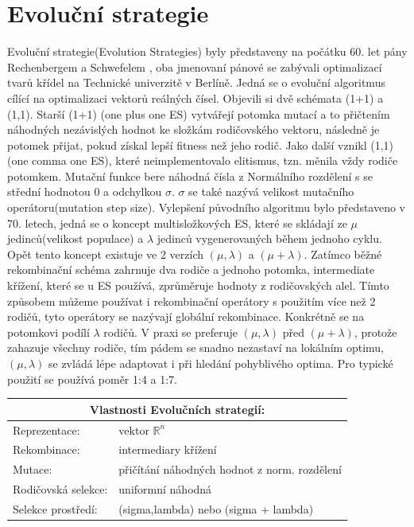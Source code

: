 \section{Evoluční strategie}
\label{sec:ES}
Evoluční strategie(Evolution Strategies) byly představeny na počátku 60. let pány Rechenbergem a Schwefelem \cite{Beyer2002}, oba jmenovaní pánové se zabývali optimalizací tvarů křídel na Technické univerzitě v Berlíně. Jedná se o evoluční algoritmus cílící na optimalizaci vektorů reálných čísel. Objevili si dvě schémata (1+1) a (1,1). Starší (1+1) (one plus one ES) vytvářejí potomka mutací a to přičtením náhodných nezávislých hodnot ke složkám rodičovského vektoru, následně je potomek přijat, pokud získal lepší fitness než jeho rodič. Jako další vznikl (1,1) (one comma one ES), které neimplementovalo elitismus, tzn. měnila vždy rodiče potomkem. Mutační funkce bere náhodná čísla z Normálního rozdělení s se střední hodnotou 0 a odchylkou $\sigma$. $\sigma$ se také nazývá velikost mutačního operátoru(mutation step size). Vylepšení původního algoritmu bylo představeno v 70. letech, jedná se o koncept multisložkových ES, které se skládají ze $\mu$ jedinců(velikost populace) a $\lambda$ jedinců vygenerovaných během jednoho cyklu. Opět tento koncept existuje ve 2 verzích $(\mu,\lambda)$ a $(\mu + \lambda)$. Zatímco běžné rekombinační schéma zahrnuje dva rodiče a jednoho potomka, intermediate křížení, které se u ES používá, zprůměruje hodnoty z rodičovských alel. Tímto způsobem můžeme používat i rekombinační operátory s použitím více než 2 rodičů, tyto operátory se nazývají globální rekombinace. Konkrétně se na potomkovi podílí $\lambda$ rodičů. V praxi se preferuje $(\mu,\lambda)$ před $(\mu + \lambda)$, protože zahazuje všechny rodiče, tím pádem se snadno nezastaví na lokálním optimu, $(\mu,\lambda)$ se zvládá lépe adaptovat i při hledání pohyblivého optima. Pro typické použití se používá poměr 1:4 a 1:7. 
\begin{center}
  \begin{tabular}{ l l }
      \multicolumn{2}{c}{Vlastnosti Evolučních strategií:} \\
      \hline \hline
      Reprezentace: & vektor $\mathbb{R}^n$ \\
      \hline  
      Rekombinace: & intermediary křížení \\
      \hline  
      Mutace: & přičítání náhodných hodnot z norm. rozdělení \\
      \hline   
      Rodičovská selekce: & uniformní náhodná \\
      \hline   
      Selekce prostředí: & (sigma,lambda) nebo (sigma + lambda) \\
    \end{tabular} 
  \end{center} \par

